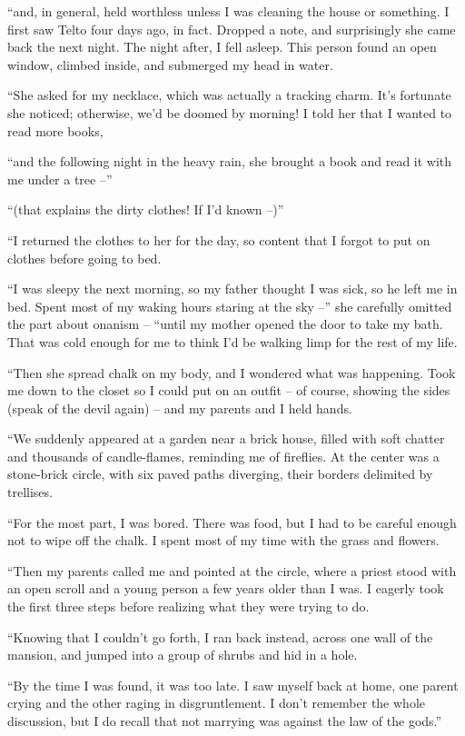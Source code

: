 ``and, in general, held worthless unless I was cleaning the house or something. I first saw Telto four days ago, in fact. Dropped a note, and surprisingly she came back the next night. The night after, I fell asleep. This person found an open window, climbed inside, and submerged my head in water.

``She asked for my necklace, which was actually a tracking charm. It's fortunate she noticed; otherwise, we'd be doomed by morning! I told her that I wanted to read more books,

``and the following night in the heavy rain, she brought a book and read it with me under a tree --''

``(that explains the dirty clothes! If I'd known --)''

``I returned the clothes to her for the day, so content that I forgot to put on clothes before going to bed.

``I was sleepy the next morning, so my father thought I was sick, so he left me in bed. Spent most of my waking hours staring at the sky --'' she carefully omitted the part about onanism -- ``until my mother opened the door to take my bath. That was cold enough for me to think I'd be walking limp for the rest of my life.

``Then she spread chalk on my body, and I wondered what was happening. Took me down to the closet so I could put on an outfit -- of course, showing the sides (speak of the devil again) -- and my parents and I held hands.

``We suddenly appeared at a garden near a brick house, filled with soft chatter and thousands of candle-flames, reminding me of fireflies. At the center was a stone-brick circle, with six paved paths diverging, their borders delimited by trellises.

``For the most part, I was bored. There was food, but I had to be careful enough not to wipe off the chalk. I spent most of my time with the grass and flowers.

``Then my parents called me and pointed at the circle, where a priest stood with an open scroll and a young person a few years older than I was. I eagerly took the first three steps before realizing what they were trying to do.

``Knowing that I couldn't go forth, I ran back instead, across one wall of the mansion, and jumped into a group of shrubs and hid in a hole.

``By the time I was found, it was too late. I saw myself back at home, one parent crying and the other raging in disgruntlement. I don't remember the whole discussion, but I do recall that not marrying was against the law of the gods.''

